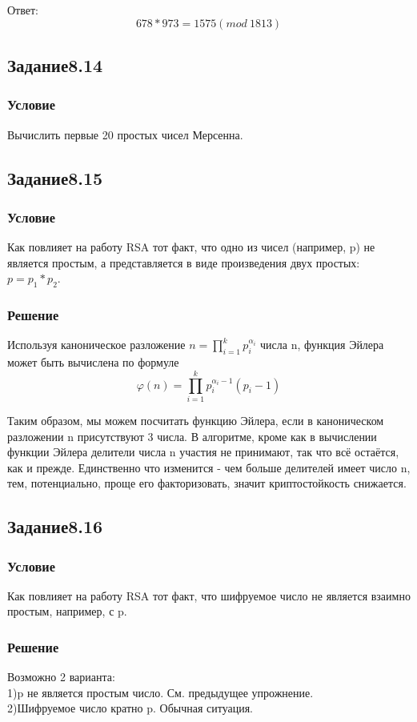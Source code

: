 \documentclass[10pt,a4paper]{article}
\begin{document}
Ответ:\\
$$ 678*973 = 1575 (mod\ 1813) $$

\subsection*{Задание8.14}
\subsubsection*{Условие}
Вычислить первые 20 простых чисел Мерсенна.

\subsection*{Задание8.15}
\subsubsection*{Условие}
Как повлияет на работу RSA тот факт, что одно из чисел (например, p)
не является простым, а представляется в виде произведения двух
простых: $p=p_1*p_2$. 
\subsubsection*{Решение}
Используя каноническое разложение 
$ n = \prod_{i=1}^k p_i^{\alpha_i} $ числа n,
функция Эйлера может быть вычислена по формуле
$$  \varphi(n) = \prod_{i=1}^k p_i^{\alpha_i - 1} \left( p_i - 1 \right) $$

Таким образом, мы можем посчитать функцию Эйлера, если в каноническом
разложении n присутствуют 3 числа. В алгоритме, кроме как в вычислении
функции Эйлера делители числа n участия не принимают, так что всё
остаётся, как и прежде. Единственно что изменится - чем больше
делителей имеет число n, тем, потенциально, проще его факторизовать,
значит криптостойкость снижается.

\subsection*{Задание8.16}
\subsubsection*{Условие}
Как повлияет на работу RSA тот факт, что шифруемое число не является
взаимно простым, например, с p.
\subsubsection*{Решение}
Возможно 2 варианта: \\
1)p не является простым число. См. предыдущее
упрожнение.\\
2)Шифруемое число кратно p. Обычная ситуация.
\end{document}
